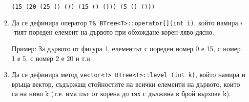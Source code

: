 \documentclass[12pt,a4paper]{article}
\begin{document}
\begin{enumerate}
	\texttt{(15 (20 (25 () ()) (15 () ())) (5 () ()))}

	\item Да се дефинира оператор \texttt{T\& BTree<T>::operator[](int i)}, който намира $i$-тият пореден елемент на дървото при обхождане корен-ляво-дясно.

	Пример: За дървото от фигура 1, елементът с пореден номер 0 е 15, с номер 1 е 5, с номер 2 е 20 и т.н.

	\item Да се дефинира метод \texttt{vector<T> BTree<T>::level (int k)}, който намира и връща вектор, съдържащ стойностите на всички елементи на дървото, които са на ниво k (т.е. има път от корена до тях с дължина в брой върхове k).







\end{enumerate}
\end{document}
